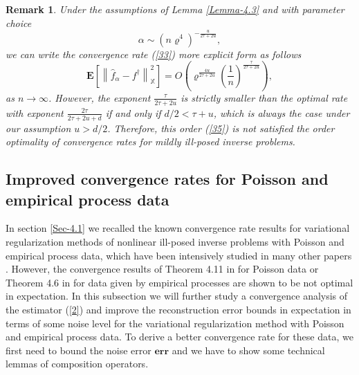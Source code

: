 \documentclass[10pt]{iopart}
\newtheorem{remark}[theorem]{Remark}
\begin{document}
\begin{remark}\label{Remark-4.4}
Under the assumptions of Lemma \ref{Lemma-4.3} and with parameter choice 
\begin{equation*}
\alpha \sim (n\varrho^{4})^{-\frac{u}{2\tau+2u}},
\end{equation*}
we can write the convergence rate (\ref{33}) more explicit form as follows
\begin{equation}\label{35}
\mathbf{E}\left[\left\|\widehat{f}_{\alpha}-f^{\dagger}\right\|_{\mathbb{X}}^{2}\right]
=O\left(\varrho^{\frac{4u}{2\tau+2u}}\left(\frac{1}{n}\right)^{\frac{\tau}{2\tau+2u}}\right),
\end{equation}
as $n\rightarrow \infty$. However, the exponent $\frac{\tau}{2\tau+2u}$ is strictly smaller than the optimal rate with exponent 
$\frac{2\tau}{2\tau+2u+d}$ if and only if $d/2<\tau+u$, which is always the case under our assumption $u>d/2$. Therefore, this order
(\ref{35}) is not satisfied the order optimality of convergence rates for mildly ill-posed inverse problems.
\end{remark}


\subsection{Improved convergence rates for Poisson and empirical process data}\label{Sec-4.2}
\allowdisplaybreaks
\hspace{0.5cm}
In section \ref{Sec-4.1} we recalled the known convergence rate results for variational regularization methods of nonlinear ill-posed inverse problems with Poisson and empirical process data, which 
have been intensively studied in many other papers \cite{Dunker2014, Hofmann2007, Hohage2013, Hohage2016, Werner2012}. However, the convergence results of
Theorem 4.11 in \cite{Hohage2016} for Poisson data or Theorem 4.6 in \cite{Dunker2014} for data given by empirical processes are shown to be not 
optimal in expectation. In this subsection we will further study a convergence analysis of the estimator (\ref{2}) and improve
the reconstruction error bounds in expectation in terms of some noise level for the variational regularization method 
with Poisson and empirical process data. To derive a better convergence rate for these data, we first need to bound the noise error $\mathbf{err}$ and we have to show some technical lemmas of composition operators.
\end{document}
